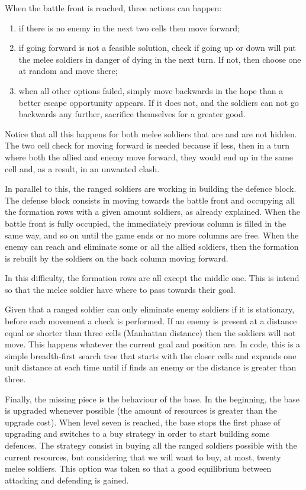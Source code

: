 \documentclass[conference]{IEEEtran}
\begin{document}
When the battle front is reached, three actions can happen: 
%
\begin{enumerate}
    \item if there is no enemy in the next two cells then move forward;
    \item if going forward is not a feasible solution, check if going up or down will put the melee soldiers in danger of dying in the next turn. If not, then choose one at random and move there;
    \item when all other options failed, simply move backwards in the hope than a better escape opportunity appears. If it does not, and the soldiers can not go backwards any further, sacrifice themselves for a greater good.
\end{enumerate}

Notice that all this happens for both melee soldiers that are and are not hidden. The two cell check for moving forward is needed because if less, then in a turn where both the allied and enemy move forward, they would end up in the same cell and, as a result, in an unwanted clash.

In parallel to this, the ranged soldiers are working in building the defence block. The defense block consists in moving towards the battle front and occupying all the formation rows with a given amount soldiers, as already explained. When the battle front is fully occupied, the immediately previous column is filled in the same way, and so on until the game ends or no more columns are free. When the enemy can reach and eliminate some or all the allied soldiers, then the formation is rebuilt by the soldiers on the back column moving forward.

In this difficulty, the formation rows are all except the middle one. This is intend so that the melee soldier have where to pass towards their goal. 

Given that a ranged soldier can only eliminate enemy soldiers if it is stationary, before each movement a check is performed. If an enemy is present at a distance equal or shorter than three cells (Manhattan distance) then the soldiers will not move. This happens whatever the current goal and position are. In code, this is a simple breadth-first search tree that starts with the closer cells and expands one unit distance at each time until if finds an enemy or the distance is greater than three.

Finally, the missing piece is the behaviour of the base. In the beginning, the base is upgraded whenever possible (the amount of resources is greater than the upgrade cost). When level seven is reached, the base stops the first phase of upgrading and switches to a buy strategy in order to start building some defences. The strategy consist in buying all the ranged soldiers possible with the current resources, but considering that we will want to buy, at most, twenty melee soldiers. This option was taken so that a good equilibrium between attacking and defending is gained.
\end{document}
